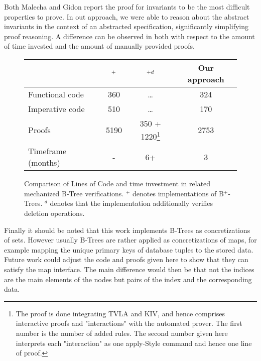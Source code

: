 Both Malecha and Gidon report the proof for invariants
to be the most difficult properties to prove.
In out approach, we were able to reason about the abstract invariants
in the context of an abstracted specification,
significantly simplifying proof reasoning.
A difference can be observed in \label{fig:proof-comparison}
both with respect to the amount of 
time invested and the amount of manually provided proofs.

\begin{figure}
    \centering
    \begin{tabular}{l|c|c|c}
        \                & \parencite{DBLP:conf/popl/MalechaMSW10}$^{+}$ & \parencite{DBLP:journals/sosym/ErnstSR15}$^{+d}$ & Our approach \\
        \hline
        Functional code &   360      & \dots                 & 324  \\
        Imperative code &   510      & \dots                 & 170  \\
        Proofs          &  5190      & 350 + 1220\footnote{
            The proof is done integrating TVLA and KIV, and hence comprises
            interactive proofs and "interactions" with the automated prover.
            The first number is the number of added rules.
            The second number given here interprets each "interaction" as one apply-Style
            command and hence one line of proof.
        } & 2753 \\
        Timeframe (months) &  -     & 6+                      & 3   \\
    \end{tabular}
    \caption{Comparison of Lines of Code and time investment in related mechanized B-Tree verifications.
    $^+$ denotes implementations of B$^+$-Trees.
    $^d$ denotes that the implementation additionally verifies deletion operations.
    }
    \label{fig:proof-comparison}
\end{figure}

Finally it should be noted that this work implements B-Trees as
concretizations of sets.
However usually B-Trees are rather applied as concretizations
of maps, for example mapping the unique primary keys
of database tuples to the stored data.
Future work could adjust the code and proofs given here
to show that they can satisfy the map interface.
The main difference would then be that not the indices
are the main elements of the nodes but pairs of the 
index and the corresponding data.
